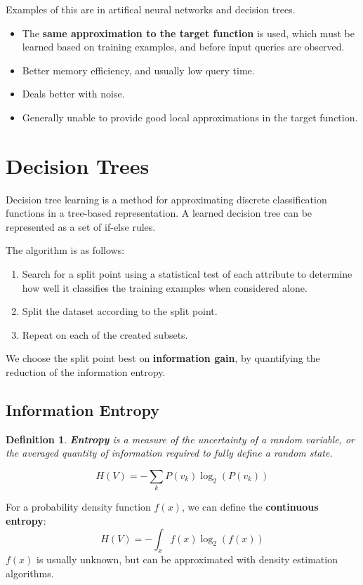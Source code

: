 \documentclass[11pt]{article}
\newtheorem{defn}{Definition}
\begin{document}
Examples of this are in artifical neural networks and decision trees.

\begin{itemize}
  \item The \textbf{same approximation to the target function} is used, which must be learned based on training examples, and before input queries are observed.
  \item Better memory efficiency, and usually low query time.
  \item Deals better with noise.
  \item Generally unable to provide good local approximations in the target function.
\end{itemize}

\section{Decision Trees}
Decision tree learning is a method for approximating discrete classification functions in a tree-based representation.
A learned decision tree can be represented as a set of if-else rules.

The algorithm is as follows:
\begin{enumerate}
  \item Search for a split point using a statistical test of each attribute to determine how well it classifies the training examples when considered alone.
  \item Split the dataset according to the split point.
  \item Repeat on each of the created subsets.
\end{enumerate}

We choose the split point best on \textbf{information gain}, by quantifying the reduction of the information entropy.

\subsection{Information Entropy}
\begin{defn}
  \textbf{Entropy} is a measure of the uncertainty of a random variable, or the averaged quantity of information required to fully define a random state.
\end{defn}

\[
  H(V) = - \sum_k P(v_k) \log_2 (P(v_k))
\]

For a probability density function $f(x)$, we can define the \textbf{continuous entropy}:
\[
  H(V) = - \int_x f(x) \log_2 (f(x))
\]
$f(x)$ is usually unknown, but can be approximated with density estimation algorithms.
\end{document}
